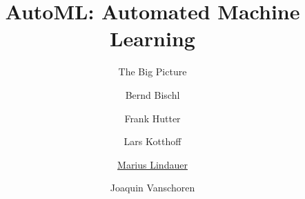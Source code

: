 




\title[AutoML: Big Picture]{AutoML: Automated Machine Learning}
\subtitle{The Big Picture}
\author[Marius Lindauer]{Bernd Bischl \and Frank Hutter \and Lars Kotthoff\newline \and \underline{Marius Lindauer} \and Joaquin Vanschoren}
\institute{}
\date{}





	
	\maketitle
	



